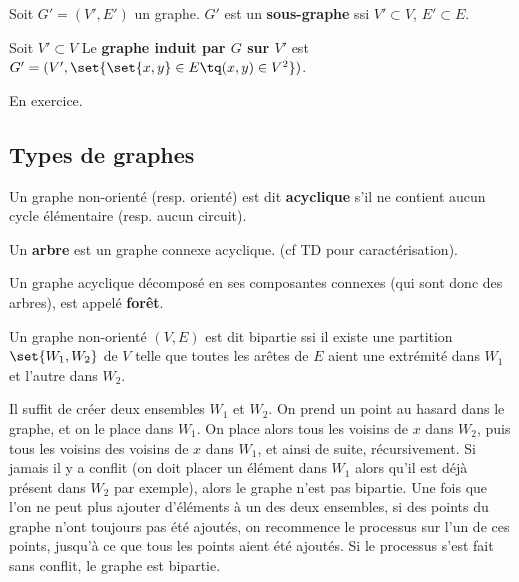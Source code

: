 \documentclass{scrartcl}
\begin{document}

			 Soit $G' = (V',E')$ un graphe.
			$G'$ est un \textbf{sous-graphe} ssi $V' \subset V$, $E' \subset E$.

			 Soit $V' \subset V$
			Le \textbf{graphe induit par $G$ sur $V'$} est $G' = (V', \set{\set{x,y}\in E \tq (x,y) \in V^2})$.

			\begin{demo}
				\item En exercice.
			\end{demo}
	
		\subsection{Types de graphes}
			 Un graphe non-orienté (resp. orienté) est dit \textbf{acyclique} s'il ne contient aucun cycle élémentaire (resp. aucun circuit).

			 Un \textbf{arbre} est un graphe connexe acyclique. (cf TD pour caractérisation).

			 Un graphe acyclique décomposé en ses composantes connexes (qui sont donc des arbres), est appelé \textbf{forêt}.

			 Un graphe non-orienté $(V,E)$ est dit bipartie ssi il existe une partition $\set{W_1,W_2}$ de $V$ telle que toutes les arêtes de $E$
			aient une extrémité dans $W_1$ et l'autre dans $W_2$.

			 Il suffit de créer deux ensembles $W_1$ et $W_2$.
			On prend un point au hasard dans le graphe, et on le place dans $W_1$. On place alors tous les voisins de $x$ dans $W_2$,
			puis tous les voisins des voisins de $x$ dans $W_1$, et ainsi de suite, récursivement. 
			Si jamais il y a conflit (on doit placer un élément dans $W_1$ alors qu'il est déjà présent dans $W_2$ par exemple),
			alors le graphe n'est pas bipartie.
			Une fois que l'on ne peut plus ajouter d'éléments à un des deux ensembles, si des points du graphe n'ont toujours pas été ajoutés, 
			on recommence le processus sur l'un de ces points, jusqu'à ce que tous les points aient été ajoutés.
			Si le processus s'est fait sans conflit, le graphe est bipartie.
\end{document}
